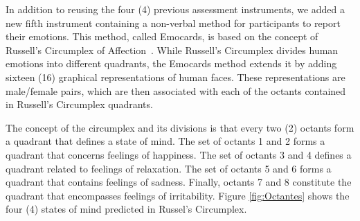 In addition to reusing the four (4) previous assessment instruments, we added a new fifth instrument containing a non-verbal method for participants to report their emotions.
This method, called Emocards, is based on the concept of Russell's Circumplex of Affection~\cite{desmet:2001}.
While Russell's Circumplex divides human emotions into different quadrants, the Emocards method extends it by adding sixteen (16) graphical representations of human faces.
These representations are male/female pairs, which are then associated with each of the octants contained in Russell's Circumplex quadrants.

The concept of the circumplex and its divisions is that every two (2) octants form a quadrant that defines a state of mind.
The set of octants 1 and 2 forms a quadrant that concerns feelings of happiness.
The set of octants 3 and 4 defines a quadrant related to feelings of relaxation.
The set of octants 5 and 6 forms a quadrant that contains feelings of sadness.
Finally, octants 7 and 8 constitute the quadrant that encompasses feelings of irritability.
Figure \ref{fig:Octantes} shows the four (4) states of mind predicted in Russel's Circumplex.

